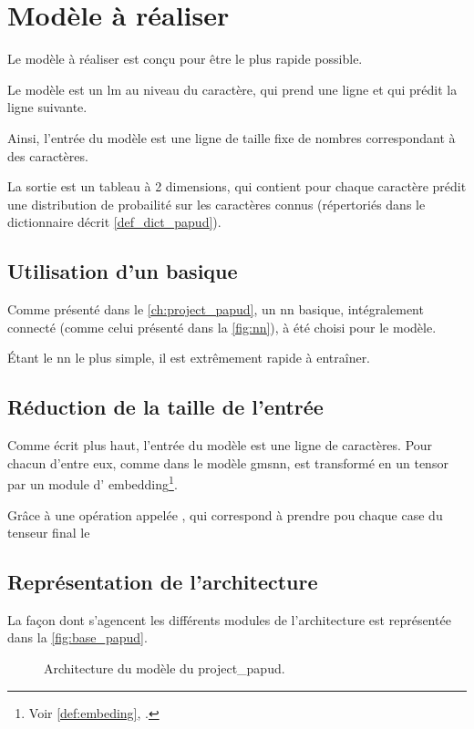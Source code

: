 \chapter{Modèle à réaliser}\label{ch:papud_model}
Le modèle à réaliser est conçu pour être le plus rapide possible.

Le modèle est un \gls{lm} au niveau du caractère, qui prend une ligne et qui prédit la ligne suivante.

Ainsi, l'entrée du modèle est une ligne de taille fixe de nombres correspondant à des caractères.

La sortie est un tableau à 2 dimensions, qui contient pour chaque caractère prédit une distribution de probailité sur les caractères connus (répertoriés dans le dictionnaire décrit \autoref{def_dict_papud}).

\section{Utilisation d'un  basique}
Comme présenté dans le \autoref{ch:project_papud}, un \gls{nn} basique, intégralement connecté (comme celui présenté dans la \autoref{fig:nn}), à été choisi pour le modèle.

Étant le \gls{nn} le plus simple, il est extrêmement rapide à entraîner.

\section{Réduction de la taille de l'entrée}
Comme écrit plus haut, l'entrée du modèle est une ligne de caractères.
Pour chacun d'entre eux, comme dans le modèle \gls{gmsnn}, est transformé en un \gls{tensor} par un module d' \gls{embedding}\footnote{Voir \autoref{def:embeding}, .}.

Grâce à une opération appelée \og {} \fg{}, qui correspond à prendre pou chaque case du tenseur final le 

\section{Représentation de l'architecture}

La façon dont s'agencent les différents modules de l'architecture est représentée dans la \autoref{fig:base_papud}.

\begin{figure}[ht]
	\centering
	
	\label{fig:base_papud}
	\caption[Architecture du modèle du projet PAPUD]{Architecture du modèle du \gls{project_papud}.}
\end{figure}

